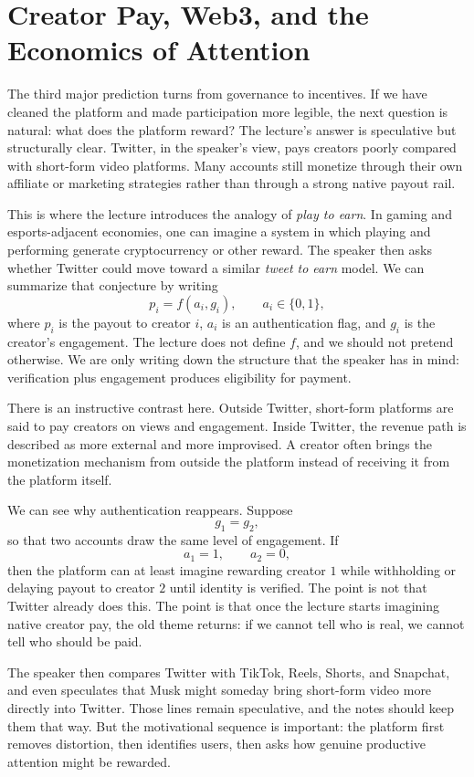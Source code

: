\section{Creator Pay, Web3, and the Economics of Attention}

The third major prediction turns from governance to incentives. If we have cleaned the platform and made participation more legible, the next question is natural: what does the platform reward? The lecture's answer is speculative but structurally clear. Twitter, in the speaker's view, pays creators poorly compared with short-form video platforms. Many accounts still monetize through their own affiliate or marketing strategies rather than through a strong native payout rail.

This is where the lecture introduces the analogy of \emph{play to earn}. In gaming and esports-adjacent economies, one can imagine a system in which playing and performing generate cryptocurrency or other reward. The speaker then asks whether Twitter could move toward a similar \emph{tweet to earn} model. We can summarize that conjecture by writing
\begin{equation}
p_i = f(a_i,g_i),
\qquad
a_i \in \{0,1\},
\end{equation}
where \(p_i\) is the payout to creator \(i\), \(a_i\) is an authentication flag, and \(g_i\) is the creator's engagement. The lecture does not define \(f\), and we should not pretend otherwise. We are only writing down the structure that the speaker has in mind: verification plus engagement produces eligibility for payment.

There is an instructive contrast here. Outside Twitter, short-form platforms are said to pay creators on views and engagement. Inside Twitter, the revenue path is described as more external and more improvised. A creator often brings the monetization mechanism from outside the platform instead of receiving it from the platform itself.

We can see why authentication reappears. Suppose
\[
g_1 = g_2,
\]
so that two accounts draw the same level of engagement. If
\[
a_1 = 1,\qquad a_2 = 0,
\]
then the platform can at least imagine rewarding creator \(1\) while withholding or delaying payout to creator \(2\) until identity is verified. The point is not that Twitter already does this. The point is that once the lecture starts imagining native creator pay, the old theme returns: if we cannot tell who is real, we cannot tell who should be paid.

The speaker then compares Twitter with TikTok, Reels, Shorts, and Snapchat, and even speculates that Musk might someday bring short-form video more directly into Twitter. Those lines remain speculative, and the notes should keep them that way. But the motivational sequence is important: the platform first removes distortion, then identifies users, then asks how genuine productive attention might be rewarded.

